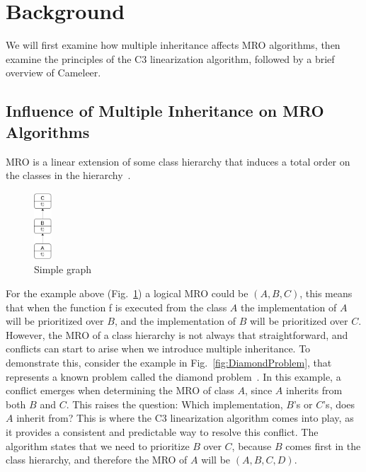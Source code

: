 \documentclass[runningheads]{llncs}
\begin{document}
\section{Background}

We will first examine how multiple inheritance affects MRO algorithms, then examine the principles of the C3 linearization algorithm, followed by a brief overview of Cameleer.

\subsection{Influence of Multiple Inheritance on MRO Algorithms}
MRO is a linear extension of some class hierarchy
 that induces a total order on the classes in the hierarchy~\autocite{hivertControllingC3Super2024}.

\begin{figure}[htbp]
  \centering
  \includegraphics[width=0.06\textwidth]{images/SimpleDiagram.png}
  \caption{Simple graph}
  \label{fig:simpleDiagram}
\end{figure}

For the example above (Fig.~\ref{fig:simpleDiagram}) a logical MRO could be $(A, B, C)$, this means that when the function f is executed from the class $A$ the implementation of $A$ will be prioritized over $B$, and the implementation of $B$ will be prioritized over $C$.\\
However, the MRO of a class hierarchy is not always that straightforward, and conflicts can start to arise when we introduce multiple inheritance.
To demonstrate this, consider the example in Fig.~\ref{fig:DiamondProblem}, that represents a known problem called the diamond problem~\autocite{mondayezeStudiesObjectorientedProgramming2021}.
In this example, a conflict emerges when determining the MRO of class $A$, since $A$ inherits from both $B$ and $C$. This raises the question: Which implementation, $B$'s or $C$'s, does $A$ inherit from? 
This is where the C3 linearization algorithm comes into play, as it provides a consistent and predictable way to resolve this conflict. The algorithm states that we need to prioritize $B$ over $C$, because $B$ comes first in the class hierarchy, and therefore the MRO of $A$ will be $(A, B, C, D)$.
\end{document}
